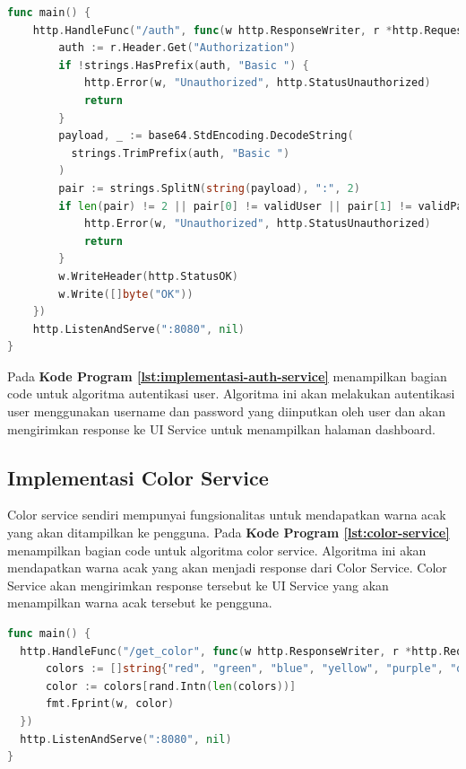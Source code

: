 \begin{lstlisting}[language=go, 
  basicstyle=\footnotesize\ttfamily, 
  caption={Implementasi Auth Service}, 
  label={lst:implementasi-auth-service}]
func main() {
    http.HandleFunc("/auth", func(w http.ResponseWriter, r *http.Request) {
        auth := r.Header.Get("Authorization")
        if !strings.HasPrefix(auth, "Basic ") {
            http.Error(w, "Unauthorized", http.StatusUnauthorized)
            return
        }
        payload, _ := base64.StdEncoding.DecodeString(
          strings.TrimPrefix(auth, "Basic ")
        )
        pair := strings.SplitN(string(payload), ":", 2)
        if len(pair) != 2 || pair[0] != validUser || pair[1] != validPass {
            http.Error(w, "Unauthorized", http.StatusUnauthorized)
            return
        }
        w.WriteHeader(http.StatusOK)
        w.Write([]byte("OK"))
    })
    http.ListenAndServe(":8080", nil)
}
\end{lstlisting}

Pada \textbf{Kode Program \ref{lst:implementasi-auth-service}} menampilkan
bagian code untuk algoritma autentikasi user. Algoritma ini akan melakukan
autentikasi user menggunakan username dan password yang diinputkan oleh user
dan akan mengirimkan response ke UI Service untuk menampilkan halaman
dashboard.

\subsection{Implementasi Color Service}
Color service sendiri mempunyai fungsionalitas untuk mendapatkan warna acak
yang akan ditampilkan ke pengguna. Pada \textbf{Kode Program
  \ref{lst:color-service}} menampilkan bagian code untuk algoritma color service.
Algoritma ini akan mendapatkan warna acak yang akan menjadi response dari Color
Service. Color Service akan mengirimkan response tersebut ke UI Service yang
akan menampilkan warna acak tersebut ke pengguna.

\begin{lstlisting}[language=go, 
  basicstyle=\footnotesize\ttfamily,
  caption={Implementasi Color Service},
  label={lst:color-service}]
func main() {
  http.HandleFunc("/get_color", func(w http.ResponseWriter, r *http.Request) {
      colors := []string{"red", "green", "blue", "yellow", "purple", "orange"}
      color := colors[rand.Intn(len(colors))]
      fmt.Fprint(w, color)
  })
  http.ListenAndServe(":8080", nil)
}
\end{lstlisting}

